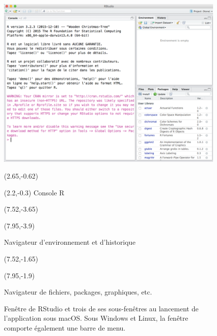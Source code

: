 \begin{figure}[t]
  \includegraphics{rstudiowindow-screenshot}
  \vspace{0.5\TPVertModule}

  \begingroup
  \begin{textblock}{0.5}(2.65,-0.62)
    \large\faLongArrowDown
  \end{textblock}
  \begin{textblock}{2}(2.2,-0.3)
    \footnotesize\sffamily Console R
  \end{textblock}

  \begin{textblock}{1}(7.52,-3.65)
    \large\faLongArrowRight
  \end{textblock}
  \begin{textblock}{2.2}(7.95,-3.9)
    \footnotesize\sffamily\raggedright Navigateur d'environnement et d'historique
  \end{textblock}

  \begin{textblock}{1}(7.52,-1.65)
    \large\faLongArrowRight
  \end{textblock}
  \begin{textblock}{2.2}(7.95,-1.9)
    \footnotesize\sffamily\raggedright Navigateur de fichiers, packages, graphiques, etc.
  \end{textblock}
  \endgroup
  \caption{Fenêtre de RStudio et trois de ses sous-fenêtres au
    lancement de l'application sous macOS. Sous Windows et Linux, la
    fenêtre comporte également une barre de menu.}
  \label{fig:rstudio:rstudiowindow}
\end{figure}

